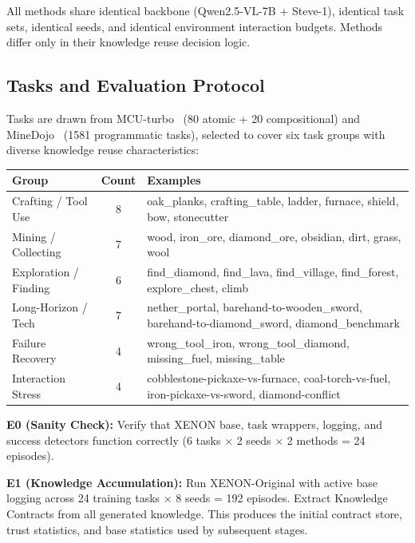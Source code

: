 \documentclass[letterpaper]{article}
\begin{document}
All methods share identical backbone (Qwen2.5-VL-7B + Steve-1), identical task sets, identical seeds, and identical environment interaction budgets. Methods differ only in their knowledge reuse decision logic.

\subsection{Tasks and Evaluation Protocol}

Tasks are drawn from MCU-turbo~\cite{mcu2024} (80 atomic + 20 compositional) and MineDojo~\cite{minedojo2022} (1581 programmatic tasks), selected to cover six task groups with diverse knowledge reuse characteristics:

\begin{center}
\begin{tabular}{lcl}
\toprule
\textbf{Group} & \textbf{Count} & \textbf{Examples} \\
\midrule
Crafting / Tool Use  & 8  & oak\_planks, crafting\_table, ladder, furnace, shield, bow, stonecutter \\
Mining / Collecting  & 7  & wood, iron\_ore, diamond\_ore, obsidian, dirt, grass, wool \\
Exploration / Finding& 6  & find\_diamond, find\_lava, find\_village, find\_forest, explore\_chest, climb \\
Long-Horizon / Tech  & 7  & nether\_portal, barehand-to-wooden\_sword, barehand-to-diamond\_sword, diamond\_benchmark \\
Failure Recovery     & 4  & wrong\_tool\_iron, wrong\_tool\_diamond, missing\_fuel, missing\_table \\
Interaction Stress   & 4  & cobblestone-pickaxe-vs-furnace, coal-torch-vs-fuel, iron-pickaxe-vs-sword, diamond-conflict \\
\bottomrule
\end{tabular}
\end{center}

\textbf{E0 (Sanity Check):} Verify that \textsc{XENON} base, task wrappers, logging, and success detectors function correctly (6 tasks $\times$ 2 seeds $\times$ 2 methods = 24 episodes).

\textbf{E1 (Knowledge Accumulation):} Run \textsc{XENON}-Original with active base logging across 24 training tasks $\times$ 8 seeds = 192 episodes. Extract Knowledge Contracts from all generated knowledge. This produces the initial contract store, trust statistics, and base statistics used by subsequent stages.
\end{document}
